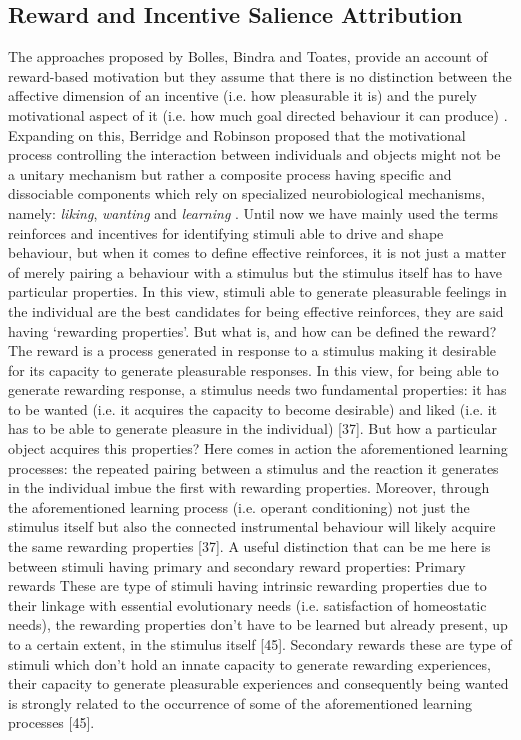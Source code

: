 \subsection{Reward and Incentive Salience Attribution}
\label{incentive_salience}
The approaches proposed by Bolles, Bindra and Toates,  provide an account of reward-based motivation but they assume that there is no distinction between the affective dimension of an incentive (i.e. how pleasurable it is) and the purely motivational aspect of it (i.e. how much goal directed behaviour it can produce) \cite{bindra1978adaptive,toates1994comparing}. Expanding on this, Berridge and Robinson proposed that the motivational process controlling the interaction between individuals and objects might not be a unitary mechanism but rather a composite process having specific and dissociable components which rely on specialized neurobiological mechanisms, namely: \emph{liking}, \emph{wanting} and \emph{learning} \cite{berridge1998role,berridge2009dissecting,smith2011disentangling}.
Until now we have mainly used the terms reinforces and incentives for identifying stimuli able to drive and shape behaviour, but when it comes to define effective reinforces, it is not just a matter of merely pairing a behaviour with a stimulus but the stimulus itself has to have particular properties. In this view, stimuli able to generate pleasurable feelings in the individual are the best candidates for being effective reinforces, they are said having ‘rewarding properties’. But what is, and how can be defined the reward?  The reward is a process generated in response to a stimulus making it desirable for its capacity to generate pleasurable responses. In this view, for being able to generate rewarding response, a stimulus needs two fundamental properties: it has to be wanted (i.e. it acquires the capacity to become desirable) and liked (i.e. it has to be able to generate pleasure in the individual) [37]. But how a particular object acquires this properties? Here comes in action the aforementioned learning processes: the repeated pairing between a stimulus and the reaction it generates in the individual imbue the first with rewarding properties. Moreover, through the aforementioned learning process (i.e. operant conditioning) not just the stimulus itself but also the connected instrumental behaviour will likely acquire the same rewarding properties [37]. A useful distinction that can be me here is between stimuli having primary and secondary reward properties:
Primary rewards 
These are type of stimuli having intrinsic rewarding properties due to their linkage with essential evolutionary needs (i.e. satisfaction of homeostatic needs),  the rewarding properties don’t have to be learned but already present, up to a certain extent, in the stimulus itself [45]. 
Secondary rewards
these are type of stimuli which don’t hold an innate capacity to generate rewarding experiences, their capacity to generate pleasurable experiences and consequently being wanted is strongly related to the occurrence of some of the aforementioned learning processes [45].

